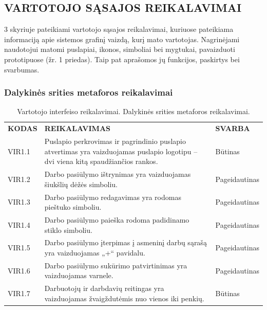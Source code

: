 \documentclass{VUMIFPSkursinis}
\begin{document}
\subsection{VARTOTOJO SĄSAJOS REIKALAVIMAI}
3 skyriuje pateikiami vartotojo sąsajos reikalavimai, kuriuose pateikiama informaciją apie sistemos grafinį vaizdą, kurį mato vartotojas. Nagrinėjami naudotojui matomi puslapiai, ikonos, simboliai bei mygtukai, pavaizduoti prototipuose (žr. 1 priedas). Taip pat aprašomos jų funkcijos, paskirtys bei svarbumas. 

\subsubsection{Dalykinės srities metaforos reikalavimai}
\begin{table}[H]
\caption{Vartotojo interfeiso reikalavimai. Dalykinės srities metaforos reikalavimai.}
\centering
\normalsize
\begin{tabular}{|p{2cm}|p{10cm}|p{3cm}|}
\hline
\rowcolor{gray!30}
\multicolumn{3}{|l|}{\textbf{1.	Dalykinės srities metaforos reikalavimai}} \\ \hline
\textbf{KODAS}& \multicolumn{1}{m{10cm}|}{\textbf{REIKALAVIMAS}} & \textbf{SVARBA} \\ \hline
VIR1.1 & \multicolumn{1}{m{10cm}|}{Puslapio perkrovimas ir pagrindinio puslapio atvertimas yra vaizduojamas puslapio logotipu – dvi viena kitą spaudžiančios rankos.} & Būtinas \\ \hline
VIR1.2 & \multicolumn{1}{m{10cm}|}{Darbo pasiūlymo ištrynimas yra vaizduojamas šiukšlių dėžės simboliu.} & Pageidautinas \\ \hline
VIR1.3 & \multicolumn{1}{m{10cm}|}{Darbo pasiūlymo redagavimas yra rodomas pieštuko simboliu.} & Pageidautinas \\ \hline
VIR1.4 & \multicolumn{1}{m{10cm}|}{Darbo pasiūlymo paieška rodoma padidinamo stiklo simboliu.} & Pageidautinas \\ \hline
VIR1.5 & \multicolumn{1}{m{10cm}|}{Darbo pasiūlymo įterpimas į asmeninį darbų sąrašą yra vaizduojamas „+“ pavidalu.} & Pageidautinas \\ \hline
VIR1.6 & \multicolumn{1}{m{10cm}|}{Darbo pasiūlymo sukūrimo patvirtinimas yra vaizduojamas varnele.} & Pageidautinas \\ \hline
VIR1.7 & \multicolumn{1}{m{10cm}|}{Darbuotojų ir darbdavių reitingas yra vaizduojamas žvaigždutėmis nuo vienos iki penkių.} & Būtinas \\ \hline
\end{tabular}
\end{table}
\end{document}
